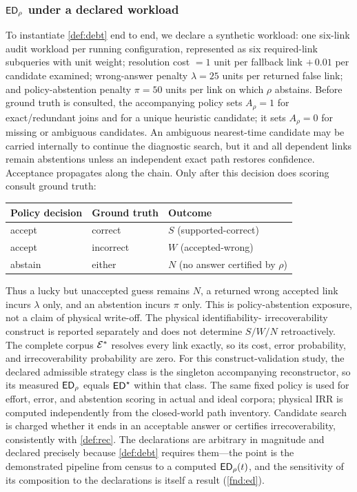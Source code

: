 \subsubsection{$\mathsf{ED}_\rho$ under a declared workload}
\label{sec:sim-workload}
To instantiate \cref{def:debt} end to end, we declare a synthetic workload: one
six-link audit workload per running configuration, represented as six required-link
subqueries with unit weight; resolution cost
$= 1$ unit per fallback link $+\,0.01$ per candidate examined; wrong-answer
penalty $\lambda=25$ units per returned false link; and policy-abstention penalty
$\pi = 50$ units per link on which $\rho$ abstains. Before ground truth is
consulted, the accompanying policy sets $A_\rho=1$ for exact/redundant joins and for a
unique heuristic candidate; it sets $A_\rho=0$ for missing or ambiguous candidates.
An ambiguous nearest-time candidate may be carried internally to continue the
diagnostic search, but it and all dependent links remain abstentions unless an
independent exact path restores confidence. Acceptance propagates along the chain.
Only after this decision does scoring consult ground truth:
\begin{center}
\begin{tabular}{@{}lll@{}}
\toprule
Policy decision & Ground truth & Outcome \\
\midrule
accept & correct & $S$ (supported-correct) \\
accept & incorrect & $W$ (accepted-wrong) \\
abstain & either & $N$ (no answer certified by $\rho$) \\
\bottomrule
\end{tabular}
\end{center}
Thus a lucky but unaccepted guess remains $N$, a returned wrong accepted link incurs
$\lambda$ only, and an abstention incurs $\pi$ only. This is policy-abstention
exposure, not a claim of physical write-off. The physical identifiability-
irrecoverability construct is reported separately and does not determine $S/W/N$
retroactively. The complete corpus
$\mathcal{E}^{*}$ resolves every link exactly, so its cost, error probability, and
irrecoverability probability are zero. For this construct-validation study, the
declared admissible strategy class is the singleton accompanying reconstructor, so its
measured $\mathsf{ED}_\rho$ equals $\mathsf{ED}^{\star}$ within that class. The same fixed policy is
used for effort, error, and abstention scoring in actual and ideal corpora; physical
IRR is computed independently from the closed-world path inventory.
Candidate search is charged whether it
ends in an acceptable answer or certifies irrecoverability, consistently with
\cref{def:rec}. The declarations are arbitrary in magnitude and
declared precisely because \cref{def:debt} requires them---the point is the
demonstrated pipeline from census to a computed $\mathsf{ED}_\rho(t)$, and the sensitivity
of its composition to the declarations is itself a result
(\cref{fnd:ed}).

